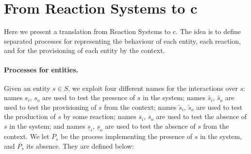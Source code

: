 

\section{From Reaction Systems to c\CNA}
\label{sec:trans}
Here we present a translation from Reaction Systems to c\CNA.
The idea is to define separated processes for representing the behaviour of each entity, each reaction, 
and for the provisioning of each entity by the context.

\paragraph{Processes for entities.}
Given an entity $s \in S$, we exploit four different names for the interactions over $s$:
names $s_i$, $s_o$ are used to test the presence of $s$ in the system; names $\hat{s}_i$, $\hat{s}_o$ are used to test the provisioning of $s$ from the context;
names $\tilde{s}_i$, $\tilde{s}_o$  are used to test the production of $s$ by some reaction; names $\overline{s}_i$, $\overline{s}_o$ are used to test the absence of $s$  in the system; and names $\underline{s}_i$, $\underline{s}_o$ are used to test the absence of $s$ from the context.
We let $P_s$ be the process implementing the  presence of $s$ in the system, and $\overline{P_s}$ its absence.
They are defined below:

